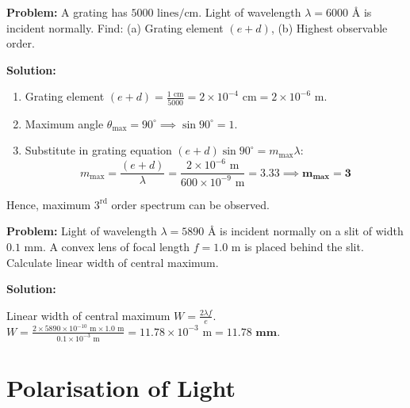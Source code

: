 \documentclass[12pt,a4paper]{article}
\begin{document}
\begin{tcolorbox}[examplebox, title={\textbf{Solved Problem 1: Grating Spectral Lines and Maximum Order}}]
\textbf{Problem:} A grating has $5000\text{ lines/cm}$. Light of wavelength $\lambda = 6000\text{ \AA}$ is incident normally. Find: (a) Grating element $(e+d)$, (b) Highest observable order.

\textbf{Solution:}\par\noindent
\begin{enumerate}[leftmargin=*, itemsep=2pt]
  \item Grating element $(e+d) = \frac{1\text{ cm}}{5000} = 2 \times 10^{-4}\text{ cm} = 2 \times 10^{-6}\text{ m}$.
  \item Maximum angle $\theta_{\max} = 90^\circ \implies \sin 90^\circ = 1$.
  \item Substitute in grating equation $(e+d)\sin 90^\circ = m_{\max} \lambda$:
   \begin{equation}
   m_{\max} = \frac{(e+d)}{\lambda} = \frac{2 \times 10^{-6}\text{ m}}{600 \times 10^{-9}\text{ m}} = 3.33 \implies \mathbf{m_{\max} = 3}
   \end{equation}
\end{enumerate}
Hence, maximum $3^{\text{rd}}$ order spectrum can be observed.
\end{tcolorbox}

\begin{tcolorbox}[examplebox, title={\textbf{Solved Problem 2: Single Slit Central Width}}]
\textbf{Problem:} Light of wavelength $\lambda = 5890\text{ \AA}$ is incident normally on a slit of width $0.1\text{ mm}$. A convex lens of focal length $f = 1.0\text{ m}$ is placed behind the slit. Calculate linear width of central maximum.

\textbf{Solution:}\par\noindent
Linear width of central maximum $W = \frac{2 \lambda f}{e}$.
$W = \frac{2 \times 5890 \times 10^{-10}\text{ m} \times 1.0\text{ m}}{0.1 \times 10^{-3}\text{ m}} = 11.78 \times 10^{-3}\text{ m} = \mathbf{11.78\text{ mm}}$.
\end{tcolorbox}

\section{Polarisation of Light}
\end{document}
